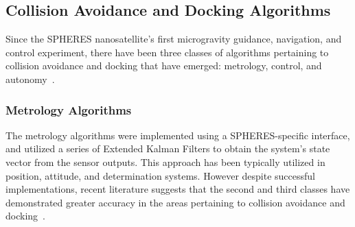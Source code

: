 \documentclass[journal, 10pt]{IEEEtran}
\begin{document}
\subsection{Collision Avoidance and Docking Algorithms}
Since the SPHERES nanosatellite's first microgravity guidance, navigation, and control experiment, there have been three classes of algorithms pertaining to collision avoidance and docking that have emerged: metrology, control, and autonomy~\cite{SPHERES_form}.

\subsubsection{Metrology Algorithms}
The metrology algorithms were implemented using a SPHERES-specific interface, and utilized a series of Extended Kalman Filters to obtain the system's state vector from the sensor outputs. This approach has been typically utilized in position, attitude, and determination systems. However despite successful implementations, recent literature suggests that the second and third classes have demonstrated greater accuracy in the areas pertaining to collision avoidance and docking~\cite{SPHERES_form}.
\end{document}
